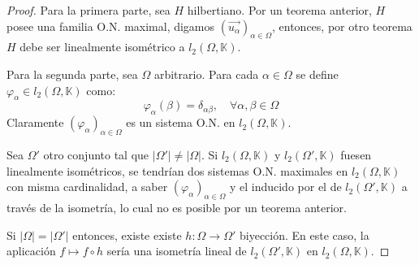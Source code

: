 \documentclass[12pt]{report}
\theoremstyle{largebreak}
\newcommand\cf[3]{\ensuremath{#1:#2\rightarrow#3}}
\newcommand\abs[1]{\ensuremath{\big|#1\big|}}
\begin{document}
    \begin{proof}
        Para la primera parte, sea $H$ hilbertiano. Por un teorema anterior, $H$ posee una familia O.N. maximal, digamos $\left(\vec{u_\alpha} \right)_{\alpha\in\Omega}$, entonces, por otro teorema $H$ debe ser linealmente isométrico a $l_2(\Omega,\mathbb{K})$.

        Para la segunda parte, sea $\Omega$ arbitrario. Para cada $\alpha\in\Omega$ se define $\varphi_\alpha\in l_2(\Omega,\mathbb{K})$ como:
        \begin{equation*}
            \varphi_{\alpha}(\beta)=\delta_{\alpha\beta},\quad\forall\alpha,\beta\in\Omega
        \end{equation*}
        Claramente $\left(\varphi_\alpha \right)_{\alpha\in\Omega}$ es un sistema O.N. en $l_2(\Omega,\mathbb{K})$.

        Sea $\Omega'$ otro conjunto tal que $\abs{\Omega'}\neq\abs{\Omega}$. Si $l_2(\Omega,\mathbb{K})$ y $l_2(\Omega',\mathbb{K})$ fuesen linealmente isométricos, se tendrían dos sistemas O.N. maximales en $l_2(\Omega,\mathbb{K})$ con misma cardinalidad, a saber $\left(\varphi_\alpha \right)_{\alpha\in\Omega}$ y el inducido por el de $l_2(\Omega',\mathbb{K})$ a través de la isometría, lo cual no es posible por un teorema anterior.

        Si $\abs{\Omega}=\abs{\Omega'}$ entonces, existe existe $\cf{h}{\Omega}{\Omega'}$ biyección. En este caso, la aplicación $f\mapsto f\circ h$ sería una isometría lineal de $l_2(\Omega',\mathbb{K})$ en $l_2(\Omega,\mathbb{K})$.
    \end{proof}
\end{document}
